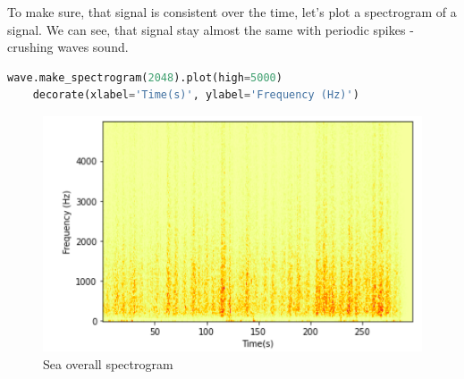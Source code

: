 \documentclass[a4paper]{article}
\begin{document}
        To make sure, that signal is consistent over the time, let's plot a spectrogram of a signal. We can see, that signal stay almost the same with periodic spikes - crushing waves sound.
        \begin{lstlisting}[language=Python,caption=Overall spectrogram,label={lst:part1_5}]
    wave.make_spectrogram(2048).plot(high=5000)
    decorate(xlabel='Time(s)', ylabel='Frequency (Hz)')
        \end{lstlisting}
        \begin{figure}[H]
            \centering
            \includegraphics[width=\textwidth]{img/sea_spectrogram.png}
            \caption{Sea overall spectrogram}
            \label{fig:part1_1_5}
        \end{figure}
        
\end{document}
